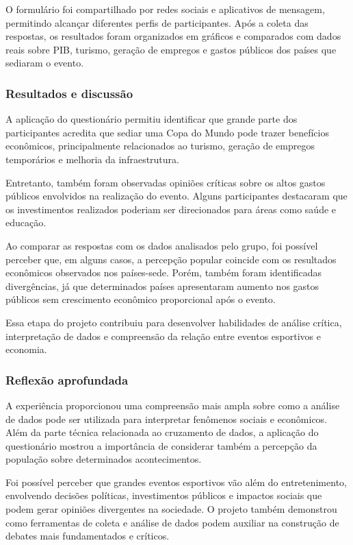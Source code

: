 \documentclass[12pt, a4paper, brazil]{article}
\begin{document}
  O formulário foi compartilhado por redes sociais e aplicativos de mensagem, permitindo alcançar diferentes perfis de participantes. Após a coleta das respostas, os resultados foram organizados em gráficos e comparados com dados reais sobre PIB, turismo, geração de empregos e gastos públicos dos países que sediaram o evento.

\subsubsection{Resultados e discussão}
A aplicação do questionário permitiu identificar que grande parte dos participantes acredita que sediar uma Copa do Mundo pode trazer benefícios econômicos, principalmente relacionados ao turismo, geração de empregos temporários e melhoria da infraestrutura.

Entretanto, também foram observadas opiniões críticas sobre os altos gastos públicos envolvidos na realização do evento. Alguns participantes destacaram que os investimentos realizados poderiam ser direcionados para áreas como saúde e educação.

Ao comparar as respostas com os dados analisados pelo grupo, foi possível perceber que, em alguns casos, a percepção popular coincide com os resultados econômicos observados nos países-sede. Porém, também foram identificadas divergências, já que determinados países apresentaram aumento nos gastos públicos sem crescimento econômico proporcional após o evento.

Essa etapa do projeto contribuiu para desenvolver habilidades de análise crítica, interpretação de dados e compreensão da relação entre eventos esportivos e economia.

\subsubsection{Reflexão aprofundada}
A experiência proporcionou uma compreensão mais ampla sobre como a análise de dados pode ser utilizada para interpretar fenômenos sociais e econômicos. Além da parte técnica relacionada ao cruzamento de dados, a aplicação do questionário mostrou a importância de considerar também a percepção da população sobre determinados acontecimentos.

Foi possível perceber que grandes eventos esportivos vão além do entretenimento, envolvendo decisões políticas, investimentos públicos e impactos sociais que podem gerar opiniões divergentes na sociedade. O projeto também demonstrou como ferramentas de coleta e análise de dados podem auxiliar na construção de debates mais fundamentados e críticos.
\end{document}
